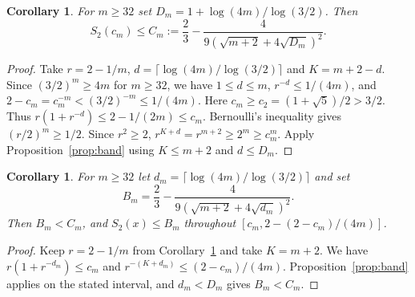 \documentclass[11pt,reqno]{amsart}
\newtheorem{corollary}[theorem]{Corollary}
\begin{document}
\begin{corollary}\label{cor:explicit}
For $m\ge32$ set $D_m=1+\log(4m)/\log(3/2)$. Then
\[
 S_2(c_m)\le C_m:=\frac23-
       \frac4{9(\sqrt{m+2}+4\sqrt{D_m})^2}.
\]
\end{corollary}
\begin{proof}
Take $r=2-1/m$, $d=\lceil\log(4m)/\log(3/2)\rceil$ and $K=m+2-d$.
Since $(3/2)^m\ge4m$ for $m\ge32$, we have $1\le d\le m$,
$r^{-d}\le1/(4m)$, and $2-c_m=c_m^{-m}<(3/2)^{-m}\le1/(4m)$.
Here $c_m\ge c_2=(1+\sqrt5)/2>3/2$. Thus
$r(1+r^{-d})\le2-1/(2m)\le c_m$.
Bernoulli's inequality gives $(r/2)^m\ge1/2$. Since $r^2\ge2$,
$r^{K+d}=r^{m+2}\ge2^m\ge c_m^m$. Apply
Proposition~\ref{prop:band} using $K\le m+2$ and $d\le D_m$.
\end{proof}

\begin{corollary}\label{cor:interval}
For $m\ge32$ let $d_m=\lceil\log(4m)/\log(3/2)\rceil$ and set
\[
 B_m=\frac23-\frac4{9(\sqrt{m+2}+4\sqrt{d_m})^2}.
\]
Then $B_m<C_m$, and $S_2(x)\le B_m$ throughout
$[c_m,2-(2-c_m)/(4m)]$.
\end{corollary}
\begin{proof}
Keep $r=2-1/m$ from Corollary~\ref{cor:explicit} and take $K=m+2$.
We have $r(1+r^{-d_m})\le c_m$ and
$r^{-(K+d_m)}\le(2-c_m)/(4m)$. Proposition~\ref{prop:band}
applies on the stated interval, and $d_m<D_m$ gives $B_m<C_m$.
\end{proof}
\end{document}
